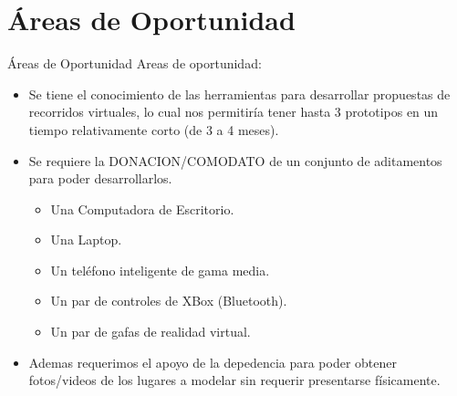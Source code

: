 \documentclass[aspectratio=169,compress]{beamer}
\begin{document}
\section[CP1]{Áreas de Oportunidad}
\begin{frame}{Áreas de Oportunidad}
Areas de oportunidad:
\begin{itemize}
\item Se tiene el conocimiento de las herramientas para desarrollar propuestas de recorridos virtuales, lo cual nos permitiría tener hasta 3 prototipos en un tiempo relativamente corto (de 3 a 4 meses).
\item Se requiere la DONACION/COMODATO de un conjunto de aditamentos para poder desarrollarlos.
\begin{itemize}
\item Una Computadora de Escritorio.
\item Una Laptop.
\item Un teléfono inteligente de gama media.
\item Un par de controles de XBox (Bluetooth).
\item Un par de gafas de realidad virtual. 
\end{itemize}
\item Ademas requerimos el apoyo de la depedencia para poder obtener fotos/videos de los lugares a modelar sin requerir presentarse físicamente. 
\end{itemize}

\end{frame}
\end{document}
